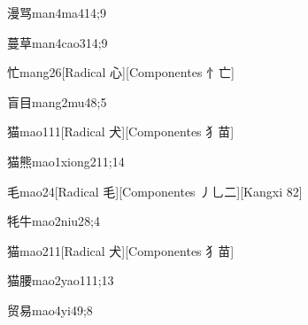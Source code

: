 \begin{verbete}{漫骂}{man4ma4}{14;9}
\end{verbete}

\begin{verbete}{蔓草}{man4cao3}{14;9}
\end{verbete}

\begin{verbete}{忙}{mang2}{6}[Radical 心][Componentes 忄亡]
\end{verbete}

\begin{verbete}{盲目}{mang2mu4}{8;5}
\end{verbete}

\begin{verbete}{猫}{mao1}{11}[Radical 犬][Componentes 犭苗]
\end{verbete}

\begin{verbete}{猫熊}{mao1xiong2}{11;14}
\end{verbete}

\begin{verbete}{毛}{mao2}{4}[Radical 毛][Componentes 丿乚二][Kangxi 82]
\end{verbete}

\begin{verbete}{牦牛}{mao2niu2}{8;4}
\end{verbete}

\begin{verbete}{猫}{mao2}{11}[Radical 犬][Componentes 犭苗]
\end{verbete}

\begin{verbete}{猫腰}{mao2yao1}{11;13}
\end{verbete}

\begin{verbete}{贸易}{mao4yi4}{9;8}
\end{verbete}

